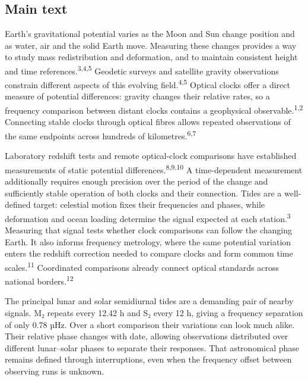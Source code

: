 \documentclass[
  10pt,
  a4paper,
]{article}
\begin{document}
\hypertarget{main-text}{%
\subsection{Main text}\label{main-text}}

Earth's gravitational potential varies as the Moon and Sun change
position and as water, air and the solid Earth move. Measuring these
changes provides a way to study mass redistribution and deformation, and
to maintain consistent height and time
references.\textsuperscript{3,4,5} Geodetic surveys and satellite
gravity observations constrain different aspects of this evolving
field.\textsuperscript{4,5} Optical clocks offer a direct measure of
potential differences: gravity changes their relative rates, so a
frequency comparison between distant clocks contains a geophysical
observable.\textsuperscript{1,2} Connecting stable clocks through
optical fibres allows repeated observations of the same endpoints across
hundreds of kilometres.\textsuperscript{6,7}

Laboratory redshift tests and remote optical-clock comparisons have
established measurements of static potential
differences.\textsuperscript{8,9,10} A time-dependent measurement
additionally requires enough precision over the period of the change and
sufficiently stable operation of both clocks and their connection. Tides
are a well-defined target: celestial motion fixes their frequencies and
phases, while deformation and ocean loading determine the signal
expected at each station.\textsuperscript{3} Measuring that signal tests
whether clock comparisons can follow the changing Earth. It also informs
frequency metrology, where the same potential variation enters the
redshift correction needed to compare clocks and form common time
scales.\textsuperscript{11} Coordinated comparisons already connect
optical standards across national borders.\textsuperscript{12}

The principal lunar and solar semidiurnal tides are a demanding pair of
nearby signals. M₂ repeats every 12.42 h and S₂ every 12 h, giving a
frequency separation of only 0.78 µHz. Over a short comparison their
variations can look much alike. Their relative phase changes with date,
allowing observations distributed over different lunar--solar phases to
separate their responses. That astronomical phase remains defined
through interruptions, even when the frequency offset between observing
runs is unknown.
\end{document}

